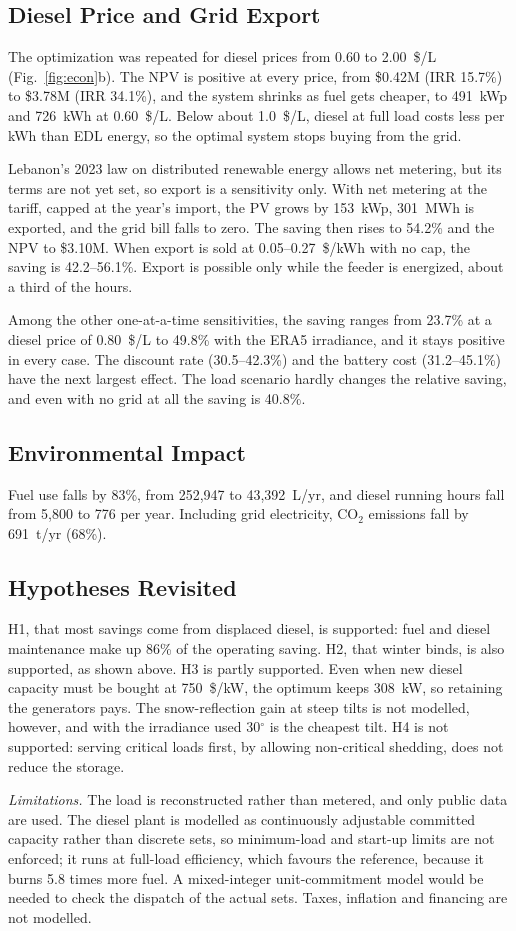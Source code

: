 \subsection{Diesel Price and Grid Export}
The optimization was repeated for diesel prices from 0.60 to 2.00~\$/L (Fig.~\ref{fig:econ}b). The
NPV is positive at every price, from \$0.42M (IRR 15.7\%) to \$3.78M (IRR 34.1\%), and the system
shrinks as fuel gets cheaper, to 491~kWp and 726~kWh at 0.60~\$/L. Below about 1.0~\$/L, diesel at
full load costs less per kWh than EDL energy, so the optimal system stops buying from the grid.

Lebanon's 2023 law on distributed renewable energy allows net metering, but its terms are not yet
set, so export is a sensitivity only. With net metering at the tariff, capped at the year's import,
the PV grows by 153~kWp, 301~MWh is exported, and the grid bill falls to zero. The saving then rises to
54.2\% and the NPV to \$3.10M. When export is sold at 0.05--0.27~\$/kWh with no cap, the saving is
42.2--56.1\%. Export is possible only while the feeder is energized, about a third of the hours.

Among the other one-at-a-time sensitivities, the saving ranges from 23.7\% at a diesel price of
0.80~\$/L to 49.8\% with the ERA5 irradiance, and it stays positive in every case. The discount rate
(30.5--42.3\%) and the battery cost (31.2--45.1\%) have the next largest effect. The load scenario
hardly changes the relative saving, and even with no grid at all the saving is 40.8\%.

\subsection{Environmental Impact}
Fuel use falls by 83\%, from 252,947 to 43,392~L/yr, and diesel running hours fall from 5,800 to 776
per year. Including grid electricity, CO$_2$ emissions fall by 691~t/yr (68\%).

\subsection{Hypotheses Revisited}
H1, that most savings come from displaced diesel, is supported: fuel and diesel maintenance make up
86\% of the operating saving. H2, that winter binds, is also supported, as shown above. H3 is partly
supported. Even when new diesel capacity must be bought at 750~\$/kW, the optimum keeps 308~kW, so
retaining the generators pays. The snow-reflection gain at steep tilts is not modelled, however, and
with the irradiance used 30$^\circ$ is the cheapest tilt. H4 is not supported: serving critical loads
first, by allowing non-critical shedding, does not reduce the storage.

\emph{Limitations.} The load is reconstructed rather than metered, and only public data are used. The
diesel plant is modelled as continuously adjustable committed capacity rather than discrete sets, so
minimum-load and start-up limits are not enforced; it runs at full-load efficiency, which favours the
reference, because it burns 5.8 times more fuel. A mixed-integer unit-commitment model would be
needed to check the dispatch of the actual sets. Taxes, inflation and financing are not modelled.
